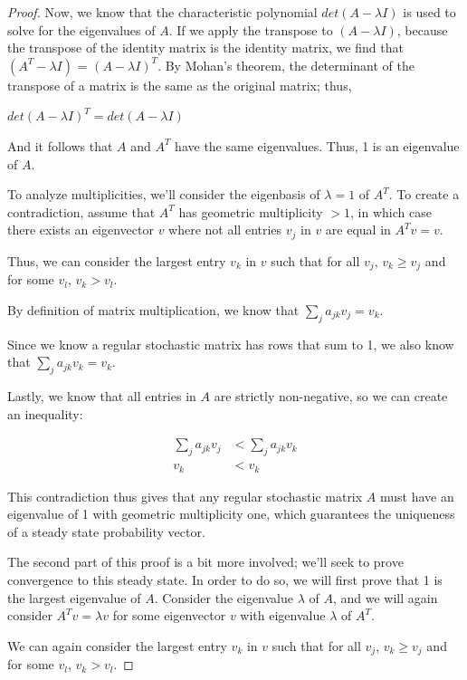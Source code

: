 \documentclass{article}
\begin{document}
\begin{enumerate}[label=]
\begin{proof}
    Now, we know that the characteristic polynomial $det(A-\lambda I)$ is used to solve for the eigenvalues of $A$. If we apply the transpose to $(A-\lambda I)$, because the transpose of the identity matrix is the identity matrix, we find that $(A^T-\lambda I)$ = $(A-\lambda I)^T$. By Mohan's theorem, the determinant of the transpose of a matrix is the same as the original matrix; thus,
    
    \begin{center}
    $det(A-\lambda I)^T = det(A-\lambda I)$
    \end{center}

    And it follows that $A$ and $A^T$ have the same eigenvalues. Thus, 1 is an eigenvalue of $A$.
    

    To analyze multiplicities, we'll consider the eigenbasis of $\lambda = 1$ of $A^T$. To create a contradiction, assume that $A^T$ has geometric multiplicity $>1$, in which case there exists an eigenvector $v$ where not all entries $v_j$ in $v$ are equal in $A^Tv=v$.

    Thus, we can consider the largest entry $v_k$ in $v$ such that for all $v_j$, $v_k\geq v_j$ and for some $v_l$, $v_k>v_l$.

    By definition of matrix multiplication, we know that $\sum_{j}a_{jk}v_j=v_k$.

    Since we know a regular stochastic matrix has rows that sum to 1, we also know that $\sum_{j}a_{jk}v_k=v_k$.

    Lastly, we know that all entries in $A$ are strictly non-negative, so we can create an inequality:

    \begin{align*}
        \sum_{j}a_{jk}v_j&<\sum_{j}a_{jk}v_k\\
        v_k&<v_k
    \end{align*}

    This contradiction thus gives that any regular stochastic matrix $A$ must have an eigenvalue of 1 with geometric multiplicity one, which guarantees the uniqueness of a steady state probability vector.

    The second part of this proof is a bit more involved; we'll seek to prove convergence to this steady state. In order to do so, we will first prove that 1 is the largest eigenvalue of $A$. Consider the eigenvalue $\lambda$ of $A$, and we will again consider $A^{T}v = \lambda v$ for some eigenvector $v$ with eigenvalue $\lambda$ of $A^T$.

    We can again consider the largest entry $v_k$ in $v$ such that for all $v_j$, $v_k\geq v_j$ and for some $v_l$, $v_k>v_l$.


\end{proof}
\end{enumerate}
\end{document}
